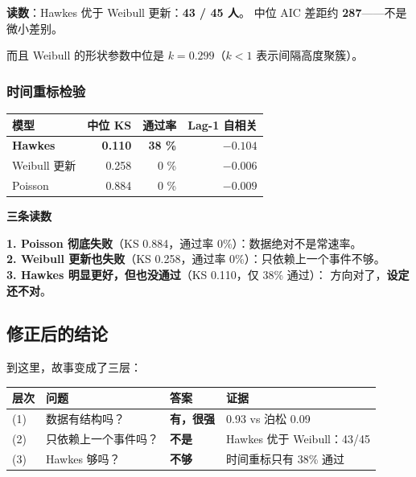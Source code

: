 \documentclass[UTF8,a4paper,11pt]{ctexart}
\newenvironment{explainbox}[1]
{\begin{center}\begin{minipage}{0.94\textwidth}\colorbox{boxbg}{\parbox{0.92\textwidth}{\textbf{#1}\par\vspace{2pt}}}}
{\end{minipage}\end{center}}
\newcommand{\hl}[1]{\textcolor{blue!70!black}{\textbf{#1}}}
\newcommand{\warn}[1]{\textcolor{red!70!black}{\textbf{#1}}}
\begin{document}
\textbf{读数}：Hawkes 优于 Weibull 更新：\hl{43 / 45 人}。
中位 AIC 差距约 \textbf{287}——不是微小差别。

而且 Weibull 的形状参数中位是 $k = 0.299$（$k<1$ 表示间隔高度聚簇）。

\subsubsection{时间重标检验}

\begin{center}
\begin{tabular}{p{4.6cm}rrr}
\toprule
\textbf{模型} & \textbf{中位 KS} & \textbf{通过率} & \textbf{Lag-1 自相关} \\
\midrule
\textbf{Hawkes} & \textbf{0.110} & \textbf{38 \%} & $-0.104$ \\
Weibull 更新 & 0.258 & 0 \% & $-0.006$ \\
Poisson & 0.884 & 0 \% & $-0.009$ \\
\bottomrule
\end{tabular}
\end{center}

\begin{explainbox}{三条读数}
\textbf{1. Poisson 彻底失败}（KS 0.884，通过率 0\%）：数据绝对不是常速率。\\
\textbf{2. Weibull 更新也失败}（KS 0.258，通过率 0\%）：只依赖上一个事件不够。\\
\textbf{3. Hawkes 明显更好，但也没通过}（KS 0.110，仅 38\% 通过）：
方向对了，\warn{设定还不对}。
\end{explainbox}

\subsection{修正后的结论}

到这里，故事变成了三层：

\begin{longtable}{@{}p{1.0cm}p{4.4cm}p{3.4cm}p{6.6cm}@{}}
\toprule
\textbf{层次} & \textbf{问题} & \textbf{答案} & \textbf{证据} \\
\midrule
{(1)}& 数据有结构吗？ & \hl{有，很强} & 0.93 vs 泊松 0.09 \\
{(2)}& 只依赖上一个事件吗？ & \hl{不是} & Hawkes 优于 Weibull：43/45 \\
{(3)}& Hawkes 够吗？ & \warn{不够} & 时间重标只有 38\% 通过 \\
\bottomrule
\end{longtable}
\end{document}
